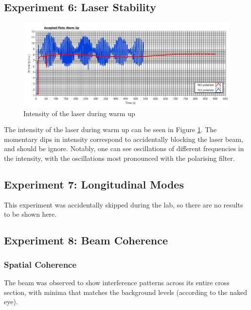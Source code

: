 \documentclass[a4paper]{scrartcl}
\begin{document}
\subsection{Experiment 6: Laser Stability}
\begin{figure}
    \centering
    \includegraphics[width = 18cm]{Q6/plot.png}
    \caption{Intensity of the laser during warm up}
    \label{fig:warm-up}
\end{figure}
The intensity of the laser during warm up can be seen in Figure \ref{fig:warm-up}. The momentary dips in intensity correspond to accidentally blocking the laser beam, and should be ignore. Notably, one can see oscillations of different frequencies in the intensity, with the oscillations most pronounced with the polarising filter.

\subsection{Experiment 7: Longitudinal Modes}
This experiment was accidentally skipped during the lab, so there are no results to be shown here.

\subsection{Experiment 8: Beam Coherence}
\subsubsection{Spatial Coherence}
The beam was observed to show interference patterns across its entire cross section, with minima that matches the background levels (according to the naked eye).
\end{document}
